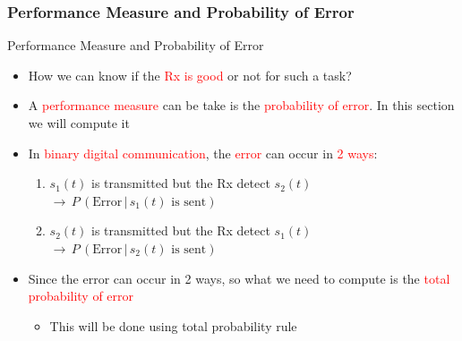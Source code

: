 \documentclass{Beamer}
\begin{document}
\subsubsection{Performance Measure and Probability of Error}

\begin{frame}[t]{Performance Measure and Probability of Error}

\begin{itemize}

\item How we can know if the \textcolor{red}{Rx is good }or not for such a task?

\item A \textcolor{red}{performance measure} can be take is the \textcolor{red}{probability of error}. In this section we will compute it

\item In \textcolor{red}{binary digital communication}, the \textcolor{red}{error} can occur in \textcolor{red}{2 ways}:

\begin{enumerate}

\item  $s_1(t)$ is transmitted but the Rx detect $s_2(t)$ $\rightarrow \, P \, (\text{Error} \, | \, s_1(t) \text{ is sent})$ 

\item $s_2(t)$ is transmitted but the Rx detect $s_1(t)$ $\rightarrow \, P \, (\text{Error} \, | \, s_2(t) \text{ is sent})$ 

\end{enumerate}

\item Since the error can occur in 2 ways, so what we need to compute is the \textcolor{red}{total probability of error}

	\begin{itemize}
	\item This will be done using total probability rule
	\end{itemize}

\end{itemize}


\end{frame}
\end{document}
